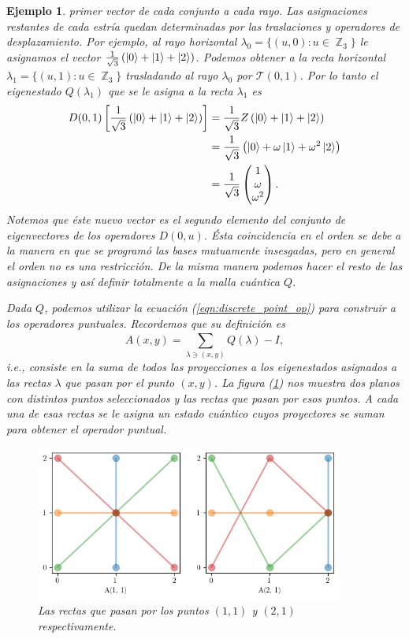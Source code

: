 \documentclass[a4paper,11pt]{report}
\DeclareMathOperator{\Z}{\mathbb{Z}}
\newtheorem{example}{Ejemplo}
\begin{document}
\begin{example}
    primer vector de cada conjunto a cada rayo. Las
    asignaciones restantes de cada estría quedan
    determinadas por las traslaciones y operadores de
    desplazamiento. Por ejemplo, al rayo horizontal
    $\lambda_0 = \{(u,0) : u \in \Z_3\}$ le asignamos el
    vector $\frac{1}{\sqrt{3}} \left( \ket 0 + \ket 1 + \ket
    2 \right)$. Podemos obtener a la recta horizontal
    $\lambda_1 = \{(u,1) : u \in \Z_3\}$ trasladando al
    rayo $\lambda_0$ por $\mathcal T(0,1)$. Por lo tanto el
    eigenestado $Q(\lambda_1)$ que se le asigna a la recta
    $\lambda_1$ es
    \begin{align}
      D(0,1) \left[ \frac{1}{\sqrt{3}} \left( \ket 0 + \ket
      1 + \ket 2\right) \right]
      &= \frac{1}{\sqrt{3}} Z \left( \ket 0 + \ket 1 + \ket
      2\right) \\
      &= \frac{1}{\sqrt{3}} \left( \ket 0 + \omega
      \ket 1 + \omega^2 \ket 2\right) \\
      &= \frac{1}{\sqrt{3}} \begin{pmatrix} 1 \\ \omega \\
      \omega^2 \end{pmatrix}.
    \end{align}
    Notemos que éste nuevo vector es el segundo elemento del
    conjunto de eigenvectores de los operadores $D(0,u)$.
    Ésta coincidencia en el orden se debe a la manera en que
    se programó las bases mutuamente insesgadas, pero en
    general el orden no es una restricción. De la misma
    manera podemos hacer el resto de las asignaciones y así
    definir totalmente a la malla cuántica $Q$.

    Dada $Q$, podemos utilizar la ecuación
    (\ref{eqn:discrete_point_op}) para construir a los
    operadores puntuales. Recordemos que su definición es
    \[
      A(x,y) = \sum_{\lambda \ni (x,y)}^{} Q(\lambda) - I,
    \] 
    i.e., consiste en la suma de todos las proyecciones a
    los eigenestados asignados a las rectas $\lambda$ que
    pasan por el punto $(x,y)$. La figura
    (\ref{fig:point-lines-3-1}) nos muestra dos planos con
    distintos puntos seleccionados y las rectas que pasan
    por esos puntos. A cada una de esas rectas se le asigna
    un estado cuántico cuyos proyectores se suman para
    obtener el operador puntual. 
    \begin{figure}[ht]
      \centering
      \includegraphics[width=0.9\textwidth]{imgs/As-3-1.png}
      \caption{Las rectas que pasan por los puntos $(1,1)$ y
      $(2,1)$ respectivamente.}
      \label{fig:point-lines-3-1}
    \end{figure}


\end{example}
\end{document}
